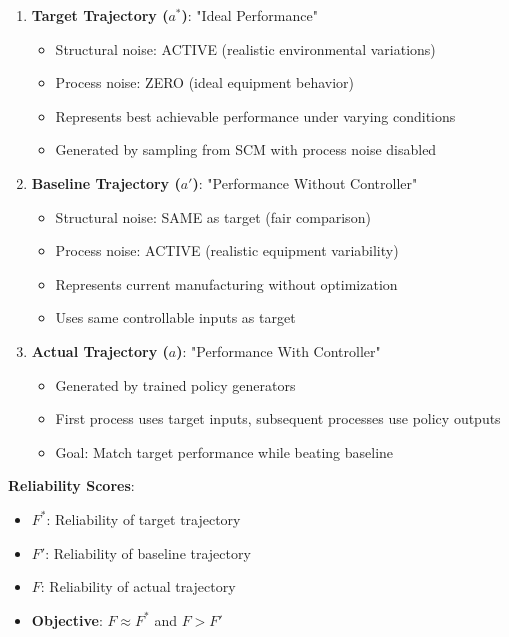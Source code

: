 \documentclass[11pt,a4paper]{article}
\begin{document}
\begin{enumerate}
    \item \textbf{Target Trajectory ($a^*$)}: "Ideal Performance"
    \begin{itemize}
        \item Structural noise: ACTIVE (realistic environmental variations)
        \item Process noise: ZERO (ideal equipment behavior)
        \item Represents best achievable performance under varying conditions
        \item Generated by sampling from SCM with process noise disabled
    \end{itemize}

    \item \textbf{Baseline Trajectory ($a'$)}: "Performance Without Controller"
    \begin{itemize}
        \item Structural noise: SAME as target (fair comparison)
        \item Process noise: ACTIVE (realistic equipment variability)
        \item Represents current manufacturing without optimization
        \item Uses same controllable inputs as target
    \end{itemize}

    \item \textbf{Actual Trajectory ($a$)}: "Performance With Controller"
    \begin{itemize}
        \item Generated by trained policy generators
        \item First process uses target inputs, subsequent processes use policy outputs
        \item Goal: Match target performance while beating baseline
    \end{itemize}
\end{enumerate}

\textbf{Reliability Scores}:
\begin{itemize}
    \item $F^*$: Reliability of target trajectory
    \item $F'$: Reliability of baseline trajectory
    \item $F$: Reliability of actual trajectory
    \item \textbf{Objective}: $F \approx F^*$ and $F > F'$
\end{itemize}
\end{document}
